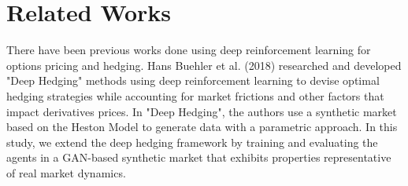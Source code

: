 \section{Related Works}

There have been previous works done using deep reinforcement learning for options pricing and hedging. Hans Buehler et al. (2018) researched and developed "Deep Hedging" \cite{deep-hedging} methods using deep reinforcement learning to devise optimal hedging strategies while accounting for market frictions and other factors that impact derivatives prices. In "Deep Hedging", the authors use a synthetic market based on the Heston Model to generate data with a parametric approach. In this study, we extend the deep hedging framework by training and evaluating the agents in a GAN-based synthetic market that exhibits properties representative of real market dynamics.